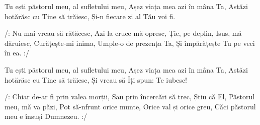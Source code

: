 \beginverse
Tu ești păstorul meu, al sufletului meu,
Așez viața mea azi în mâna Ta,
Astăzi hotărăsc cu Tine să trăiesc,
Și-n fiecare zi al Tău voi fi.
\endverse

\beginchorus
/: Nu mai vreau să rătăcesc,
Azi la cruce mă opresc,
Ție, pe deplin, Isus, mă dăruiesc,
Curățește-mi inima,
Umple-o de prezența Ta,
Și împărățește Tu pe veci în ea. :/
\endchorus

\beginverse
Tu ești păstorul meu, al sufletului meu,
Așez viața mea azi în mâna Ta,
Astăzi hotărăsc cu Tine să trăiesc,
Și vreau să Îți spun: Te iubesc!
\endverse

\beginchorus
/: Chiar de-ar fi prin valea morții,
Sau prin încercări să trec,
Știu că El, Păstorul meu, mă va păzi,
Pot să-nfrunt orice munte,
Orice val și orice greu,
Căci păstorul meu e însuși Dumnezeu. :/
\endchorus
\endsong